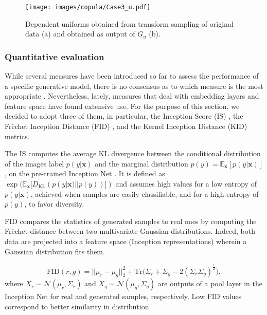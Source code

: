 \begin{figure}
\centering
\texttt{[image: images/copula/Case3\_u.pdf]}
\caption{Dependent uniforms obtained from transform sampling of original data (a) and obtained as output of $G_u$ (b).}
\label{fig:sgn_Case3_u}
\end{figure}

\subsubsection{Quantitative evaluation}
While several measures have been introduced so far to assess the performance of a specific generative model, there is no consensus as to which measure is the most appropriate \cite{ProsCons}. Nevertheless, lately, measures that deal with embedding layers and feature space have found extensive use. For the purpose of this section, we decided to adopt three of them, in particular, the Inception Score (IS) \cite{InceptionScore}, the Frèchet Inception Distance (FID) \cite{FID}, and the Kernel Inception Distance (KID) \cite{KID} metrics.

The IS computes the average KL divergence between the conditional distribution of the images label $p(y|\mathbf{x})$ and the marginal distribution $p(y)=\mathbb{E}_{\mathbf{x}}[p(y|\mathbf{x})]$, on the pre-trained Inception Net \cite{InceptionV3}. It is defined as
$\exp(\mathbb{E}_{\mathbf{x}}[D_{\text{KL}}(p(y|\mathbf{x})||p(y))])$ and assumes high values for a low entropy of $p(y|\mathbf{x})$, achieved when samples are easily classifiable, and for a high entropy of $p(y)$, to favor diversity.

FID compares the statistics of generated samples to real ones by computing the Frèchet distance between two multivariate Gaussian distributions. Indeed, both data are projected into a feature space (Inception representations) wherein a Gaussian distribution fits them.  

\begin{equation}
\text{FID}(r,g) = ||\mu_r - \mu_g||_2^2 + \text{Tr}\biggl(\Sigma_r + \Sigma_g - 2(\Sigma_r \Sigma_g)^{\frac{1}{2}}\biggr),
\end{equation}
where $X_r \sim \mathcal{N}(\mu_r, \Sigma_r)$ and $X_g \sim \mathcal{N}(\mu_g, \Sigma_g)$ are outputs of a pool layer in the Inception Net \cite{InceptionV3} for real and generated samples, respectively. Low FID values correspond to better similarity in distribution.

